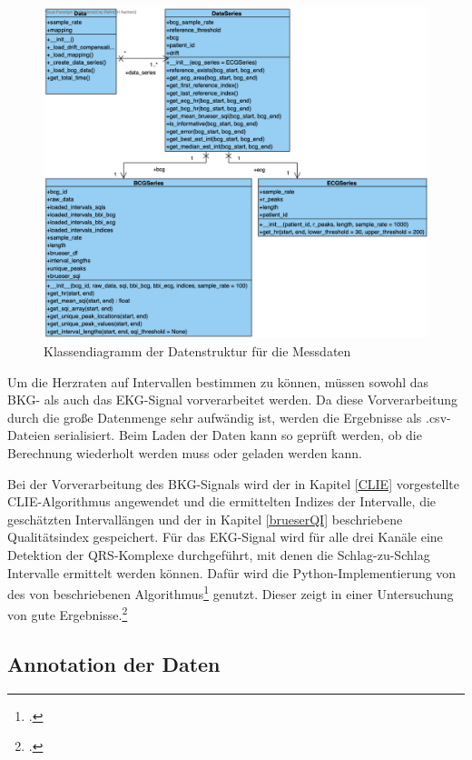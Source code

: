 	\begin{figure}[H]
		\centering
		\includegraphics[width=\textwidth]{pic/data-prep-classes.png}
		\caption[Klassendiagramm der Datenstruktur für die Messdaten]{Klassendiagramm der Datenstruktur für die Messdaten}
		\label{fig:data-prep-class}
	\end{figure}
	
	Um die Herzraten auf Intervallen bestimmen zu können, müssen sowohl das \ac{BKG}- als auch das \ac{EKG}-Signal vorverarbeitet werden. Da diese Vorverarbeitung durch die große Datenmenge sehr aufwändig ist, werden die Ergebnisse als .csv-Dateien serialisiert. Beim Laden der Daten kann so geprüft werden, ob die Berechnung wiederholt werden muss oder geladen werden kann.
	
	Bei der Vorverarbeitung des \ac{BKG}-Signals wird der in Kapitel \ref{CLIE} vorgestellte CLIE-Algorithmus angewendet und die ermittelten Indizes der Intervalle, die geschätzten Intervallängen und der in Kapitel \ref{brueserQI} beschriebene Qualitätsindex gespeichert. Für das \ac{EKG}-Signal wird für alle drei Kanäle eine Detektion der QRS-Komplexe durchgeführt, mit denen die Schlag-zu-Schlag Intervalle ermittelt werden können. Dafür wird die Python-Implementierung von \citeauthor{Howell2019} des von \citeauthor{Elgendi2010} beschriebenen Algorithmus\footcite[][]{Elgendi2010} genutzt. Dieser zeigt in einer Untersuchung von \citeauthor{Porr2019} gute Ergebnisse.\footcite[Vgl.][]{Porr2019}
	
	
	\subsection{Annotation der Daten}\label{annotation}
	

